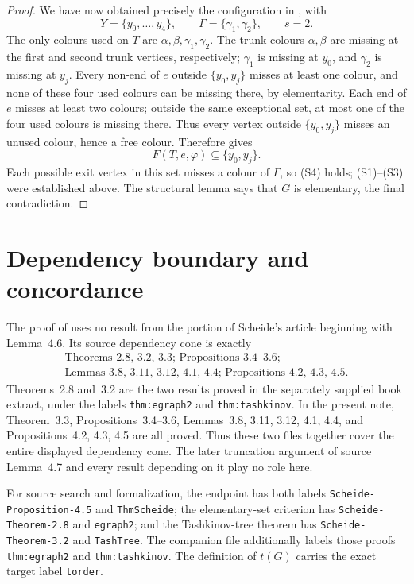 \documentclass[11pt]{article}
\theoremstyle{definition}
\newcommand{\set}[1]{\{#1\}}
\newcommand{\target}[1]{\texttt{#1}}
\begin{document}
\begin{proof}
We have now obtained precisely the configuration in
, with
\[
 Y=\set{y_0,\ldots,y_4},
 \qquad
 \Gamma=\set{\gamma_1,\gamma_2},
 \qquad s=2.
\]
The only colours used on $T$ are
$\alpha,\beta,\gamma_1,\gamma_2$. The trunk colours $\alpha,\beta$ are
missing at the first and second trunk vertices, respectively;
$\gamma_1$ is missing at $y_0$, and $\gamma_2$ is missing at $y_j$.
Every non-end of $e$ outside $\set{y_0,y_j}$ misses at least one colour,
and none of these four used colours can be missing there, by elementarity.
Each end of $e$ misses at least two colours; outside the same exceptional
set, at most one of the four used colours is missing there. Thus every
vertex outside $\set{y_0,y_j}$ misses an unused colour, hence a free
colour. Therefore  gives
\[
 F(T,e,\varphi)\subseteq\set{y_0,y_j}.
\]
Each possible exit vertex in this set misses a colour of $\Gamma$, so (S4)
holds; (S1)--(S3) were established above. The structural lemma says that
$G$ is elementary, the final contradiction.
\end{proof}

\section{Dependency boundary and concordance}

The proof of  uses no result from the portion of
Scheide's article beginning with Lemma~4.6.  Its source dependency cone is
exactly
\[
\begin{gathered}
 \text{Theorems 2.8, 3.2, 3.3; Propositions 3.4--3.6;}\\
 \text{Lemmas 3.8, 3.11, 3.12, 4.1, 4.4; Propositions 4.2, 4.3, 4.5}.
\end{gathered}
\]
Theorems~2.8 and~3.2 are the two results proved in the separately supplied
book extract, under the labels \texttt{thm:egraph2} and
\texttt{thm:tashkinov}. In the present note, Theorem~3.3,
Propositions~3.4--3.6, Lemmas~3.8, 3.11, 3.12, 4.1, 4.4, and
Propositions~4.2, 4.3, 4.5 are all proved. Thus these two files together
cover the entire displayed dependency cone. The later truncation argument
of source Lemma~4.7 and every result depending on it play no role here.

For source search and formalization, the endpoint has both labels
\target{Scheide-Proposition-4.5} and \target{ThmScheide}; the elementary-set
criterion has \target{Scheide-Theorem-2.8} and \target{egraph2}; and the
Tashkinov-tree theorem has \target{Scheide-Theorem-3.2} and
\target{TashTree}. The companion file additionally labels those proofs
\texttt{thm:egraph2} and \texttt{thm:tashkinov}. The definition of $t(G)$
carries the exact target label \target{torder}.
\end{document}
